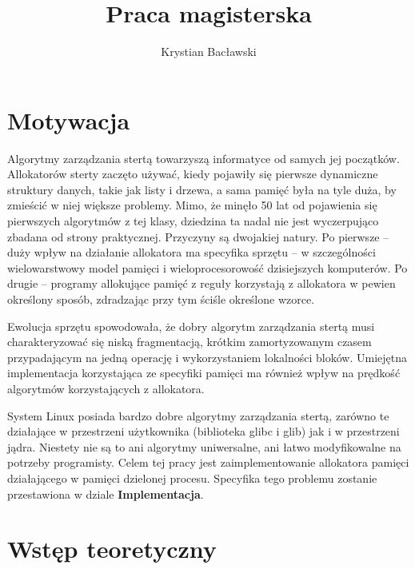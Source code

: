 \documentclass[12pt,a4paper,titlepage,twoside]{mwart}
\author{Krystian Bacławski}
\title{Praca magisterska}
\begin{document}
\maketitle
\cleardoublepage

\tableofcontents
\cleardoublepage


\setlength{\parindent}{0pt}
\setlength{\parskip}{1.2ex plus 0.5ex minus 0.2ex}

\section{Motywacja}

Algorytmy zarządzania stertą towarzyszą informatyce od samych jej początków.
Allokatorów sterty zaczęto używać, kiedy pojawiły się pierwsze dynamiczne
struktury danych, takie jak listy i drzewa, a sama pamięć była na tyle duża, by
zmieścić w niej większe problemy. Mimo, że minęło 50 lat od pojawienia się
pierwszych algorytmów z tej klasy, dziedzina ta nadal nie jest wyczerpująco
zbadana od strony praktycznej. Przyczyny są dwojakiej natury. Po pierwsze --
duży wpływ na działanie allokatora ma specyfika sprzętu -- w szczególności
wielowarstwowy model pamięci i wieloprocesorowość dzisiejszych komputerów. Po
drugie -- programy allokujące pamięć z reguły korzystają z allokatora w pewien
określony sposób, zdradzając przy tym ściśle określone wzorce.

Ewolucja sprzętu spowodowała, że dobry algorytm zarządzania stertą 
musi charakteryzować się niską fragmentacją, krótkim zamortyzowanym czasem
przypadającym na jedną operację i wykorzystaniem lokalności bloków.
Umiejętna implementacja korzystająca ze specyfiki pamięci ma również wpływ
na prędkość algorytmów korzystających z allokatora.

System Linux posiada bardzo dobre algorytmy zarządzania stertą, zarówno te
działające w przestrzeni użytkownika (biblioteka glibc i glib) jak i w
przestrzeni jądra. Niestety nie są to ani algorytmy uniwersalne, ani łatwo
modyfikowalne na potrzeby programisty. Celem tej pracy jest zaimplementowanie
allokatora pamięci działającego w pamięci dzielonej procesu. Specyfika tego
problemu zostanie przestawiona w dziale \textbf{Implementacja}.

\newpage


\section{Wstęp teoretyczny}
\end{document}
